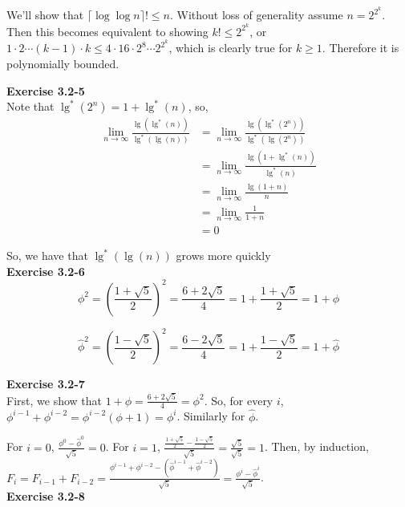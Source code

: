 \documentclass{article}
\begin{document}
We'll show that $\lceil \log \log n \rceil ! \leq n$.  Without loss of generality assume $n=2^{2^k}$.  Then this becomes equivalent to showing $k! \leq 2^{2^k}$, or $1 \cdot 2 \cdots (k-1) \cdot k \leq 4 \cdot 16 \cdot 2^8 \cdots 2^{2^k}$, which is clearly true for $k \geq 1$.  Therefore it is polynomially bounded.



\noindent\textbf{Exercise 3.2-5}\\

Note that $\lg^*(2^n) = 1+ \lg^*(n)$, so, 
\begin{align*}
\lim_{n\rightarrow \infty} \frac{\lg(\lg^*(n))}{\lg^*(\lg(n))}&= \lim_{n\rightarrow \infty} \frac{\lg(\lg^*(2^n))}{\lg^*(\lg(2^n))}\\
& = \lim_{n\rightarrow \infty} \frac{\lg(1+\lg^*(n))}{\lg^*(n)} \\
&= \lim_{n\rightarrow \infty} \frac{\lg(1+n)}{n} \\
&= \lim_{n\rightarrow \infty} \frac{1}{1+n} \\
&= 0
\end{align*}

So, we have that $\lg^*(\lg(n))$ grows more quickly\\

\noindent\textbf{Exercise 3.2-6}\\

\[ \phi^2 = \left(\frac{1 + \sqrt{5}}{2} \right)^2 = \frac{6 + 2\sqrt{5}}{4} = 1 + \frac{1 + \sqrt{5}}{2} = 1 + \phi\]

\[ \hat{\phi}^2 = \left(\frac{1 - \sqrt{5}}{2} \right)^2 = \frac{6 - 2\sqrt{5}}{4} = 1 + \frac{ 1- \sqrt{5}}{2} = 1 + \hat{\phi} \]

\noindent\textbf{Exercise 3.2-7}\\

First, we show that $1+\phi = \frac{6+2\sqrt{5}}{4} = \phi^2$. So, for every $i$, $\phi^{i-1}+ \phi^{i-2} = \phi^{i-2}(\phi+1) = \phi^i$. Similarly for $\hat\phi$.

For $i=0$, $\frac{\phi^0 - \hat\phi^0}{\sqrt{5}} = 0$. For $i=1$, $\frac{\frac{1+\sqrt{5}}{2} - \frac{1-\sqrt{5}}{2}}{\sqrt{5}} = \frac{\sqrt{5}}{\sqrt{5}} = 1$. Then, by induction, $F_i = F_{i-1}+F_{i-2} = \frac{\phi^{i-1}+\phi^{i-2} - (\hat\phi^{i-1} +\hat\phi^{i-2})}{\sqrt{5}} = \frac{\phi^i - \hat\phi^i}{\sqrt{5}}$.\\

\noindent\textbf{Exercise 3.2-8}\\
\end{document}
